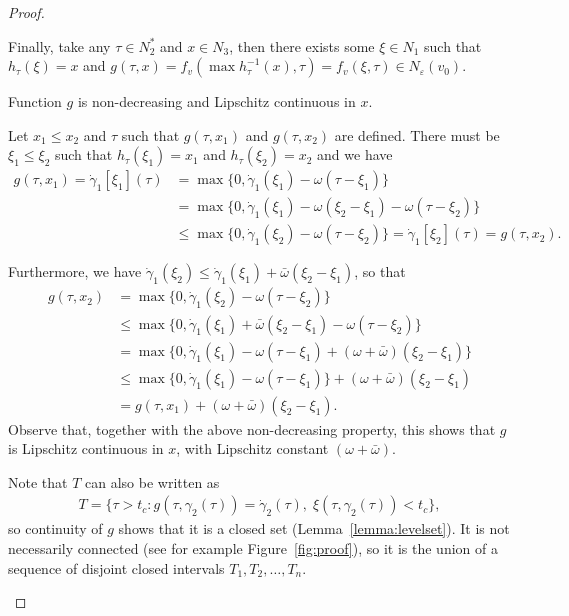 \documentclass[a4paper]{article}
\theoremstyle{definition}
\theoremstyle{plain}
\begin{document}
\begin{proof}
\begin{outline}
  \2 Finally, take any $\tau \in N_{2}^{*}$ and $x \in N_{3}$, then there exists
  some $\xi \in N_{1}$ such that $h_{\tau}(\xi) = x$ and
  $g(\tau, x) = f_{v}(\max h_{\tau}^{-1}(x), \tau) = f_{v}(\xi, \tau) \in N_{\varepsilon}(v_{0})$.

  \1 Function $g$ is non-decreasing and Lipschitz continuous in $x$.

  \2 Let $x_{1} \leq x_{2}$ and $\tau$ such that $g(\tau, x_{1})$ and
  $g(\tau, x_{2})$ are defined. There must be $\xi_{1} \leq \xi_{2}$ such that
  $h_{\tau}(\xi_{1}) = x_{1}$ and $h_{\tau}(\xi_{2}) = x_{2}$ and we have
  \begin{align*}
    g(\tau, x_{1}) = \dot{\gamma}_{1}[\xi_{1}](\tau)
    &= \max\{0, \dot{\gamma}_{1}(\xi_{1}) - \omega(\tau - \xi_{1}) \} \\
    &= \max\{0, \dot{\gamma}_{1}(\xi_{1}) - \omega(\xi_{2} - \xi_{1}) - \omega(\tau - \xi_{2}) \} \\
    &\leq \max\{0, \dot{\gamma}_{1}(\xi_{2}) - \omega(\tau - \xi_{2}) \}
    = \dot{\gamma}_{1}[\xi_{2}](\tau) = g(\tau, x_{2}) .
  \end{align*}

  \2 Furthermore, we have
  $\dot{\gamma}_{1}(\xi_{2}) \leq \dot{\gamma}_{1}(\xi_{1}) + \bar{\omega}(\xi_{2} - \xi_{1})$,
  so that
  \begin{align*}
    g(\tau, x_{2}) &= \max\{0, \dot{\gamma}_{1}(\xi_{2}) - \omega(\tau - \xi_{2}) \} \\
              &\leq \max\{0, \dot{\gamma}_{1}(\xi_{1}) + \bar{\omega}(\xi_{2} - \xi_{1}) - \omega(\tau - \xi_{2}) \} \\
              &= \max\{0, \dot{\gamma}_{1}(\xi_{1}) - \omega(\tau-\xi_{1}) + (\omega + \bar{\omega})(\xi_{2} - \xi_{1}) \} \\
              &\leq \max\{0, \dot{\gamma}_{1}(\xi_{1}) - \omega(\tau - \xi_{1}) \} + (\omega + \bar{\omega})(\xi_{2} - \xi_{1}) \\
              &= g(\tau, x_{1}) + (\omega + \bar{\omega})(\xi_{2} - \xi_{1}) .
  \end{align*}
  Observe that, together with the above non-decreasing property, this shows that
  $g$ is Lipschitz continuous in $x$, with Lipschitz constant
  $(\omega + \bar{\omega})$.

  \1 Note that $T$ can also be written as
  \begin{align}
    T = \{ \tau > t_{c} : g(\tau, \gamma_{2}(\tau)) = \dot{\gamma}_{2}(\tau), \; \xi(\tau, \gamma_{2}(\tau)) < t_{c} \} ,
  \end{align}
  so continuity of $g$ shows that it is a closed set (Lemma~\ref{lemma:levelset}). It is not
  necessarily connected (see for example Figure~\ref{fig:proof}), so it is the
  union of a sequence of disjoint closed intervals $T_{1}, T_{2}, \dots, T_{n}$.


\end{outline}
\end{proof}
\end{document}
